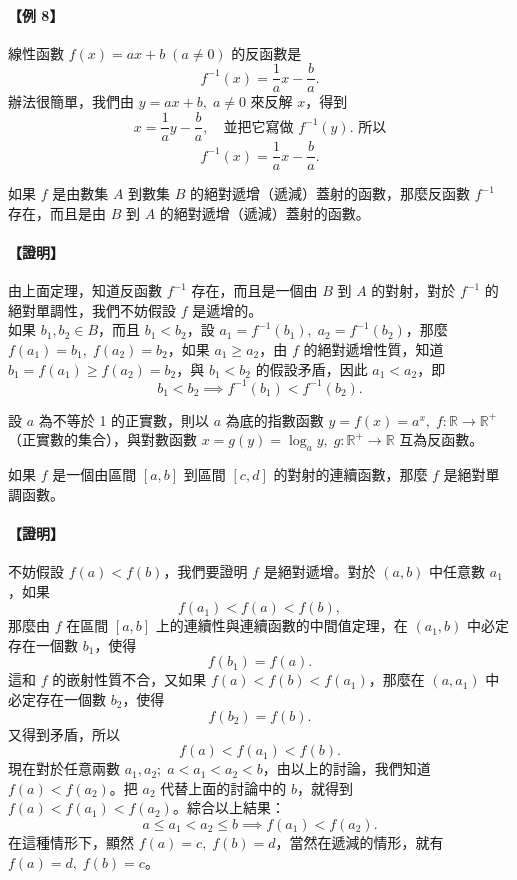 \paragraph{【例 8】} 線性函數 $f(x) = ax+b\; (a\neq 0)$ 的反函數是
\[
f^{-1}(x) = \frac{1}{a}x - \frac{b}{a}.
\]
辦法很簡單，我們由 $y = ax+b,\; a\neq 0$ 來反解 $x$，得到
\[
x = \frac{1}{a}y - \frac{b}{a},\quad \text{並把它寫做 } f^{-1}(y). \text{ 所以}
\]
\[
f^{-1}(x) = \frac{1}{a}x - \frac{b}{a}.
\]

\begin{prop}[推論 1]
如果 $f$ 是由數集 $A$ 到數集 $B$ 的絕對遞增（遞減）蓋射的函數，那麼反函數 $f^{-1}$ 存在，而且是由 $B$ 到 $A$ 的絕對遞增（遞減）蓋射的函數。
\end{prop}
\paragraph{【證明】} 由上面定理，知道反函數 $f^{-1}$ 存在，而且是一個由 $B$ 到 $A$ 的對射，對於 $f^{-1}$ 的絕對單調性，我們不妨假設 $f$ 是遞增的。\\
如果 $b_1, b_2 \in B$，而且 $b_1 < b_2$，設 $a_1 = f^{-1}(b_1),\; a_2 = f^{-1}(b_2)$，那麼 $f(a_1) = b_1,\; f(a_2) = b_2$，如果 $a_1 \ge a_2$，由 $f$ 的絕對遞增性質，知道 $b_1 = f(a_1) \ge f(a_2) = b_2$，與 $b_1 < b_2$ 的假設矛盾，因此 $a_1 < a_2$，即
\[
b_1 < b_2 \implies f^{-1}(b_1) < f^{-1}(b_2).
\]

\begin{prop}[推論 2]
設 $a$ 為不等於 1 的正實數，則以 $a$ 為底的指數函數 $y = f(x) = a^x,\; f: \mathbb{R} \to \mathbb{R}^+$（正實數的集合），與對數函數 $x = g(y) = \log_a y,\; g: \mathbb{R}^+ \to \mathbb{R}$ 互為反函數。
\end{prop}

\begin{theorem}
如果 $f$ 是一個由區間 $[a, b]$ 到區間 $[c, d]$ 的對射的連續函數，那麼 $f$ 是絕對單調函數。
\end{theorem}
\paragraph{【證明】} 不妨假設 $f(a) < f(b)$，我們要證明 $f$ 是絕對遞增。對於 $(a, b)$ 中任意數 $a_1$，如果
\[
f(a_1) < f(a) < f(b),
\]
那麼由 $f$ 在區間 $[a, b]$ 上的連續性與連續函數的中間值定理，在 $(a_1, b)$ 中必定存在一個數 $b_1$，使得
\[
f(b_1) = f(a).
\]
這和 $f$ 的嵌射性質不合，又如果 $f(a) < f(b) < f(a_1)$，那麼在 $(a, a_1)$ 中必定存在一個數 $b_2$，使得
\[
f(b_2) = f(b).
\]
又得到矛盾，所以
\[
f(a) < f(a_1) < f(b).
\]
現在對於任意兩數 $a_1, a_2;\; a < a_1 < a_2 < b$，由以上的討論，我們知道 $f(a) < f(a_2)$。把 $a_2$ 代替上面的討論中的 $b$，就得到 $f(a) < f(a_1) < f(a_2)$。綜合以上結果：
\[
a \le a_1 < a_2 \le b \implies f(a_1) < f(a_2).
\]
在這種情形下，顯然 $f(a) = c,\; f(b) = d$，當然在遞減的情形，就有 $f(a) = d,\; f(b) = c$。

